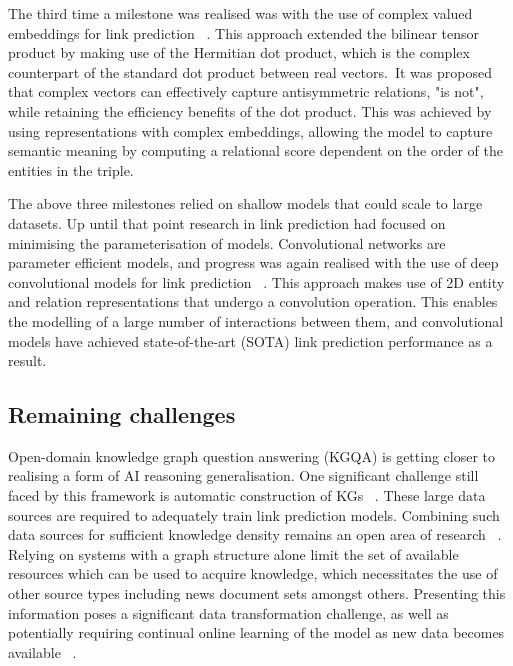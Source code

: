 \noindent The third time a milestone was realised was with the use of complex valued embeddings for link prediction \unskip~\citep{trouillon2016complex}. This approach extended the bilinear tensor product by making use of the Hermitian dot product, which is the complex counterpart of the standard dot product between real vectors.\ It was proposed that complex vectors can effectively capture antisymmetric relations, "is not", while retaining the efficiency benefits of the dot product. This was achieved by using representations with complex embeddings, allowing the model to capture semantic meaning by computing a relational score dependent on the order of the entities in the triple. \par
 
\noindent The above three milestones relied on shallow models that could scale to large datasets. Up until that point research in link prediction had focused on minimising the parameterisation of models. Convolutional networks are parameter efficient models, and progress was again realised with the use of deep convolutional models for link prediction \unskip~\citep{dettmers2018convolutional}. This approach makes use of 2D entity and relation representations that undergo a convolution operation. This enables the modelling of a large number of interactions between them, and convolutional models have achieved state-of-the-art (SOTA) link prediction performance as a result. \par

\subsection{Remaining challenges}

\noindent Open-domain knowledge graph question answering (KGQA) is getting closer to realising a form of AI reasoning generalisation. One significant challenge still faced by this framework is automatic construction of KGs \unskip~\citep{dong2014knowledge}. These large data sources are required to adequately train link prediction models. Combining such data sources for sufficient knowledge density remains an open area of research \unskip~\citep{diefenbach2018wdaqua}. Relying on systems with a graph structure alone limit the set of available resources which can be used to acquire knowledge, which necessitates the use of other source types including news document sets amongst others. Presenting this information poses a significant data transformation challenge, as well as potentially requiring continual online learning of the model as new data becomes available \unskip~\citep{abujabal2018never}. \par

